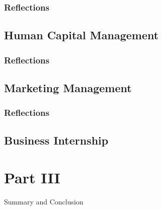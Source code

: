 \documentclass[12pt,titlepage]{article}
\begin{document}
\subsubsection{Reflections}


\subsection{Human Capital Management}
\subsubsection{Reflections}


\restoregeometry


\subsection{Marketing Management}
\subsubsection{Reflections}

\subsection{Business Internship}



\section{Part III}{Summary and Conclusion}



\end{document}
